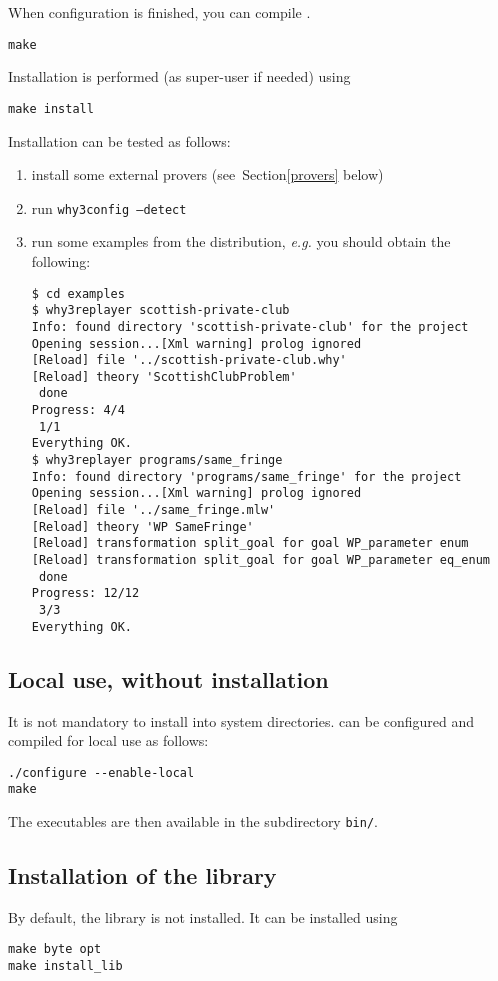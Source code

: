 When configuration is finished, you can compile \why.
\begin{verbatim}
make
\end{verbatim}
Installation is performed (as super-user if needed) using
\begin{verbatim}
make install
\end{verbatim}
Installation can be tested as follows: 
\begin{enumerate}
\item install some external provers (see~Section\ref{provers} below)
\item run \texttt{why3config --detect}
\item run some examples from the distribution, \emph{e.g.} you should
obtain the following:
\begin{verbatim}
$ cd examples
$ why3replayer scottish-private-club
Info: found directory 'scottish-private-club' for the project
Opening session...[Xml warning] prolog ignored
[Reload] file '../scottish-private-club.why'
[Reload] theory 'ScottishClubProblem'
 done
Progress: 4/4
 1/1
Everything OK.
$ why3replayer programs/same_fringe
Info: found directory 'programs/same_fringe' for the project
Opening session...[Xml warning] prolog ignored
[Reload] file '../same_fringe.mlw'
[Reload] theory 'WP SameFringe'
[Reload] transformation split_goal for goal WP_parameter enum 
[Reload] transformation split_goal for goal WP_parameter eq_enum 
 done
Progress: 12/12
 3/3
Everything OK.
\end{verbatim}
\end{enumerate}

\subsection{Local use, without installation}

It is not mandatory to install \why into system directories.
\why can be configured and compiled for local use as follows:
\begin{verbatim}
./configure --enable-local
make
\end{verbatim}
The \why executables are then available in the subdirectory \texttt{bin/}.

\subsection{Installation of the \why library}
\label{sec:installlib}

By default, the \why library is not installed. It can be installed using
\begin{verbatim}
make byte opt
make install_lib
\end{verbatim}

